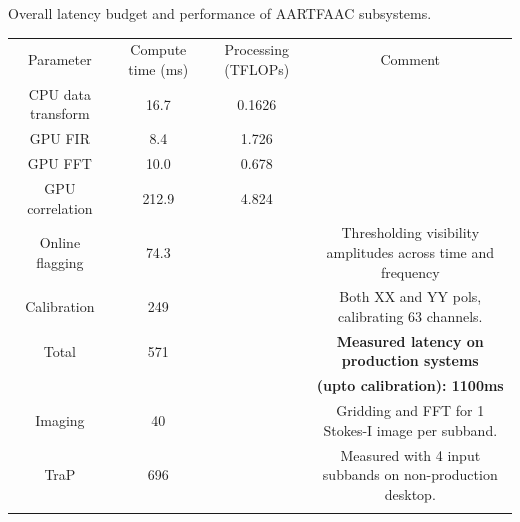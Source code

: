 \documentclass{ws-jai}
\begin{document}
\begin{wstable}[h]
\caption{Overall latency budget and performance of AARTFAAC subsystems.}
\begin{tabular}{@{}cccc@{}} \toprule
Parameter & Compute time (ms) & Processing (TFLOPs) & Comment \\ \colrule
CPU data transform & 16.7 & 0.1626  \\
GPU FIR & 8.4 & 1.726\\
GPU FFT & 10.0 & 0.678  \\
GPU correlation & 212.9 & 4.824  \\
Online flagging & 74.3 &  & Thresholding visibility amplitudes across time and frequency\\
Calibration & 249 & & Both XX and YY pols, calibrating 63 channels.\\
 \colrule
Total & 571 & & \textbf{Measured latency on production systems} \\
 & & & \textbf {(upto calibration): 1100ms} \\ \colrule

Imaging & 40 &  & Gridding and FFT for 1 Stokes-I image per subband.\\ 
TraP & 696 &  & Measured with 4 input subbands on non-production desktop.\\ \colrule
\end{tabular}
\label{tab:afaac_latency}
\end{wstable}


\end{document}
